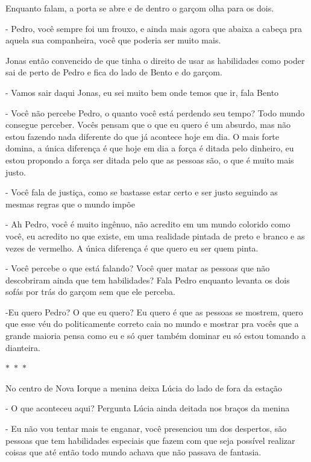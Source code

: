 Enquanto falam, a porta se abre e de dentro o garçom olha para os dois.

- Pedro, você sempre foi um frouxo, e ainda mais agora que abaixa a cabeça pra aquela sua companheira, você que poderia ser muito mais.

Jonas então convencido de que tinha o direito de usar as habilidades como poder sai de perto de Pedro e fica do lado de Bento e do garçom.

- Vamos sair daqui Jonas, eu sei muito bem onde temos que ir, fala Bento

- Você não percebe Pedro, o quanto você está perdendo seu tempo? Todo mundo consegue perceber. Vocês pensam que o que eu quero é um absurdo, mas não estou fazendo nada diferente do que já acontece hoje em dia. O mais forte domina, a única diferença é que hoje em dia a força é ditada pelo dinheiro, eu estou propondo a força ser ditada pelo que as pessoas são, o que é muito mais justo.

- Você fala de justiça, como se bastasse estar certo e ser justo seguindo as mesmas regras que o mundo impõe

- Ah Pedro, você é muito ingênuo, não acredito em um mundo colorido como você, eu acredito no que existe, em uma realidade pintada de preto e branco e as vezes de vermelho. A única diferença é que quero eu ser quem pinta.

- Você percebe o que está falando? Você quer matar as pessoas que não descobriram ainda que tem habilidades? Fala Pedro enquanto levanta os dois sofás por trás do garçom sem que ele perceba.

-Eu quero Pedro? O que eu quero? Eu quero é que as pessoas se mostrem, quero que esse véu do politicamente correto caia no mundo e mostrar pra vocês que a grande maioria pensa como eu e só quer também dominar eu só estou tomando a dianteira.

\begin{center}
	$\ast$~$\ast$~$\ast$
\end{center}

No centro de Nova Iorque a menina deixa Lúcia do lado de fora da estação

- O que aconteceu aqui? Pergunta Lúcia ainda deitada nos braços da menina

- Eu não vou tentar mais te enganar, você presenciou um dos despertos, são pessoas que tem habilidades especiais que fazem com que seja possível realizar coisas que até então todo mundo achava que não passava de fantasia.

